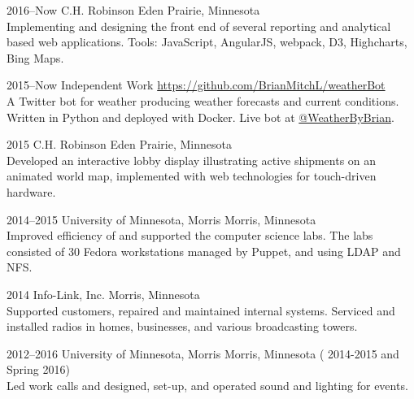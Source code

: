 \documentclass[]{cv-style} %
\begin{document}
\begin{entrylist}

\entry
{2016--Now}
{C.H. Robinson}
{Eden Prairie, Minnesota}
{ \\
Implementing and designing the front end of several reporting and analytical based web applications. Tools: JavaScript, AngularJS, webpack, D3, Highcharts, Bing Maps.}


\entry
{2015--Now}
{Independent Work}
{\href{https://github.com/BrianMitchL/weatherBot}{https://github.com/BrianMitchL/weatherBot}}
{ \\
A Twitter bot for weather producing weather forecasts and current conditions. Written in Python and deployed with Docker. Live bot at \href{https://twitter.com/WeatherByBrian}{@WeatherByBrian}.}


\entry
{2015}
{C.H. Robinson}
{Eden Prairie, Minnesota}
{ \\
Developed an interactive lobby display illustrating active shipments on an animated world map, implemented with web technologies for touch-driven hardware.}


\entry
{2014--2015}
{University of Minnesota, Morris}
{Morris, Minnesota}
{ \\
Improved efficiency of and supported the computer science labs. The labs consisted of 30 Fedora workstations managed by Puppet, and using LDAP and NFS.}


\entry
{2014}
{Info-Link, Inc.}
{Morris, Minnesota}
{ \\
Supported customers, repaired and maintained internal systems. Serviced and installed radios in homes, businesses, and various broadcasting towers.}


\entry
{2012--2016}
{University of Minnesota, Morris}
{Morris, Minnesota}
{ ( 2014-2015 and Spring 2016) \\
Led work calls and designed, set-­up, and operated sound and lighting for events.}


\end{entrylist}
\end{document}
